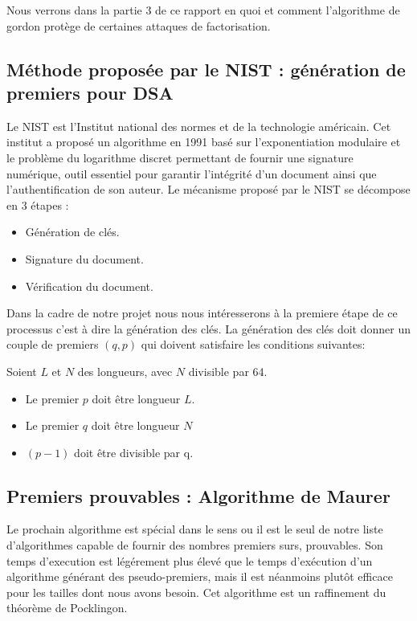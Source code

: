 \documentclass[a4paper,11pt]{article}
\begin{document}
Nous verrons dans la partie 3 de ce rapport en quoi et comment l'algorithme de gordon protège de certaines attaques de factorisation.

\subsection{Méthode proposée par le NIST :  génération de premiers pour DSA}
Le NIST est l'Institut national des normes et de la technologie américain. Cet institut a proposé un algorithme en 1991 basé sur l'exponentiation modulaire et le problème du logarithme discret permettant de fournir une signature numérique, outil essentiel pour garantir l'intégrité d'un document  ainsi que l'authentification de son auteur.\newline
Le mécanisme proposé par le NIST se décompose en 3 étapes : \newline
\begin{itemize}
\item Génération de clés. 
\item Signature du document.
\item Vérification du document.
\end{itemize}
\medbreak
Dans la cadre de notre projet nous nous intéresserons à la premiere étape de ce processus c'est à dire la génération des clés. 
La génération des clés doit donner un couple de premiers $(q,p)$ qui doivent satisfaire les conditions suivantes:


Soient $L$ et $N$ des longueurs, avec $N$ divisible par 64.
\medbreak
\begin{itemize}
\item Le premier $p$ doit être longueur $L$.  
\item Le premier $q$ doit être longueur $N$
\item $(p-1)$ doit être divisible par q.
\end{itemize}


\subsection{Premiers prouvables : Algorithme de Maurer}

Le prochain algorithme est spécial dans le sens ou il est le seul de notre liste d'algorithmes capable de fournir des nombres premiers surs, prouvables. Son temps d'execution est légérement plus élevé que le temps d'exécution d'un algorithme générant des pseudo-premiers, mais il est néanmoins plutôt efficace pour les tailles dont nous avons besoin. Cet algorithme est un raffinement du théorème de Pocklingon.
\end{document}
